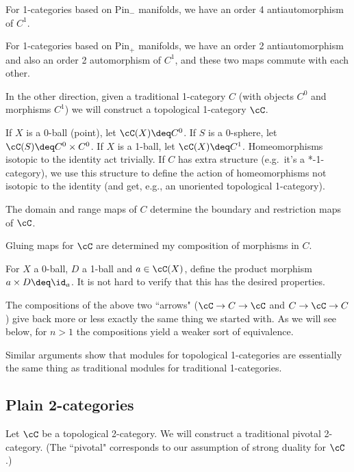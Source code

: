 For 1-categories based on $\text{Pin}_-$ manifolds,
we have an order 4 antiautomorphism of $C^1$.

For 1-categories based on $\text{Pin}_+$ manifolds,
we have an order 2 antiautomorphism and also an order 2 automorphism of $C^1$,
and these two maps commute with each other.


\medskip

In the other direction, given a traditional 1-category $C$
(with objects $C^0$ and morphisms $C^1$) we will construct a topological
1-category $\cC$.

If $X$ is a 0-ball (point), let $\cC(X) \deq C^0$.
If $S$ is a 0-sphere, let $\cC(S) \deq C^0\times C^0$.
If $X$ is a 1-ball, let $\cC(X) \deq C^1$.
Homeomorphisms isotopic to the identity act trivially.
If $C$ has extra structure (e.g.\ it's a *-1-category), we use this structure
to define the action of homeomorphisms not isotopic to the identity
(and get, e.g., an unoriented topological 1-category).

The domain and range maps of $C$ determine the boundary and restriction maps of $\cC$.

Gluing maps for $\cC$ are determined my composition of morphisms in $C$.

For $X$ a 0-ball, $D$ a 1-ball and $a\in \cC(X)$, define the product morphism 
$a\times D \deq \id_a$.
It is not hard to verify that this has the desired properties.

\medskip

The compositions of the above two ``arrows" ($\cC\to C\to \cC$ and $C\to \cC\to C$) give back 
more or less exactly the same thing we started with.  
As we will see below, for $n>1$ the compositions yield a weaker sort of equivalence.

\medskip

Similar arguments show that modules for topological 1-categories are essentially
the same thing as traditional modules for traditional 1-categories.

\subsection{Plain 2-categories}

Let $\cC$ be a topological 2-category.
We will construct a traditional pivotal 2-category.
(The ``pivotal" corresponds to our assumption of strong duality for $\cC$.)


